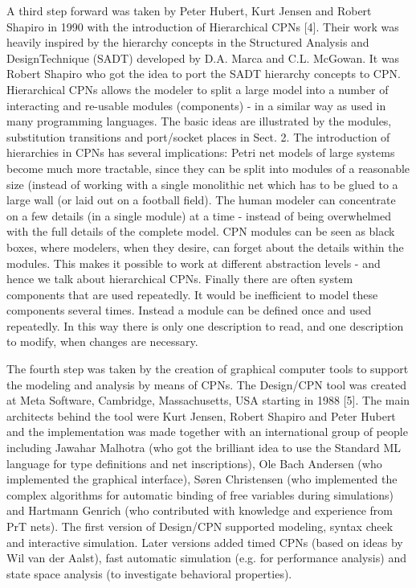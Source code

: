 A third step forward was taken by Peter Hubert, Kurt Jensen and Robert
Shapiro in 1990 with the introduction of Hierarchical CPNs [4]. Their
work was heavily inspired by the hierarchy concepts in the Structured
Analysis and DesignTechnique (SADT) developed by D.A. Marca and
C.L. McGowan. It was Robert Shapiro who got the idea to port the SADT
hierarchy concepts to CPN. Hierarchical CPNs allows the modeler to
split a large model into a number of interacting and re-usable modules
(components) - in a similar way as used in many programming
languages. The basic ideas are illustrated by the modules,
substitution transitions and port/socket places in Sect. 2. The
introduction of hierarchies in CPNs has several implications: Petri
net models of large systems become much more tractable, since they can
be split into modules of a reasonable size (instead of working with a
single monolithic net which has to be glued to a large wall (or laid
out on a football field). The human modeler can concentrate on a few
details (in a single module) at a time - instead of being overwhelmed
with the full details of the complete model. CPN modules can be seen
as black boxes, where modelers, when they desire, can forget about the
details within the modules. This makes it possible to work at
different abstraction levels - and hence we talk about hierarchical
CPNs. Finally there are often system components that are used
repeatedly. It would be inefficient to model these components several
times. Instead a module can be defined once and used repeatedly. In
this way there is only one description to read, and one description to
modify, when changes are necessary.

The fourth step was taken by the creation of graphical computer tools
to support the modeling and analysis by means of CPNs. The Design/CPN
tool was created at Meta Software, Cambridge, Massachusetts, USA
starting in 1988 [5]. The main architects behind the tool were Kurt
Jensen, Robert Shapiro and Peter Hubert and the implementation was
made together with an international group of people including Jawahar
Malhotra (who got the brilliant idea to use the Standard ML language
for type definitions and net inscriptions), Ole Bach Andersen (who
implemented the graphical interface), Søren Christensen (who
implemented the complex algorithms for automatic binding of free
variables during simulations) and Hartmann Genrich (who contributed
with knowledge and experience from PrT nets). The first version of
Design/CPN supported modeling, syntax cheek and interactive
simulation. Later versions added timed CPNs (based on ideas by Wil van
der Aalst), fast automatic simulation (e.g. for performance analysis)
and state space analysis (to investigate behavioral properties).

